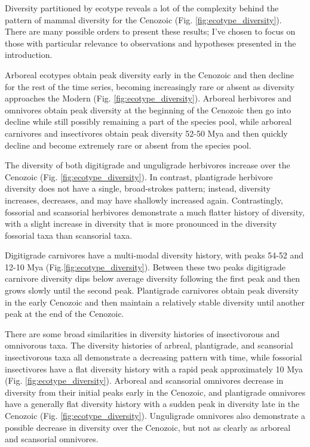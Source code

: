 \documentclass[12pt,letterpaper]{article}
\begin{document}
\begin{figure}[ht]
  \label{fig:macro_values}
\end{figure}



Diversity partitioned by ecotype reveals a lot of the complexity behind the pattern of mammal diversity for the Cenozoic (Fig. \ref{fig:ecotype_diversity}). There are many possible orders to present these results; I've chosen to focus on those with particular relevance to observations and hypotheses presented in the introduction.

Arboreal ecotypes obtain peak diversity early in the Cenozoic and then decline for the rest of the time series, becoming increasingly rare or absent as diversity approaches the Modern (Fig. \ref{fig:ecotype_diversity}). Arboreal herbivores and omnivores obtain peak diversity at the beginning of the Cenozoic then go into decline while still possibly remaining a part of the species pool, while arboreal carnivores and insectivores obtain peak diversity 52-50 Mya and then quickly decline and become extremely rare or absent from the species pool.

The diversity of both digitigrade and unguligrade herbivores increase over the Cenozoic (Fig. \ref{fig:ecotype_diversity}). In contrast, plantigrade herbivore diversity does not have a single, broad-strokes pattern; instead, diversity increases, decreases, and may have shallowly increased again. Contrastingly, fossorial and scansorial herbivores demonstrate a much flatter history of diversity, with a slight increase in diversity that is more pronounced in the diversity fossorial taxa than scansorial taxa.

Digitigrade carnivores have a multi-modal diversity history, with peaks 54-52 and 12-10 Mya (Fig.\ref{fig:ecotype_diversity}). Between these two peaks digitigrade carnivore diversity dips below average diversity following the first peak and then grows slowly until the second peak. Plantigrade carnivores obtain peak diversity in the early Cenozoic and then maintain a relatively stable diversity until another peak at the end of the Cenozoic.

There are some broad similarities in diversity histories of insectivorous and omnivorous taxa. The diversity histories of arbreal, plantigrade, and scansorial insectivorous taxa all demonstrate a decreasing pattern with time, while fossorial insectivores have a flat diversity history with a rapid peak approximately 10 Mya (Fig. \ref{fig:ecotype_diversity}). Arboreal and scansorial omnivores decrease in diversity from their initial peaks early in the Cenozoic, and plantigrade omnivores have a generally flat diversity history with a sudden peak in diversity late in the Cenozoic (Fig. \ref{fig:ecotype_diversity}). Unguligrade omnivores also demonstrate a possible decrease in diversity over the Cenozoic, but not as clearly as arboreal and scansorial omnivores.
\end{document}
